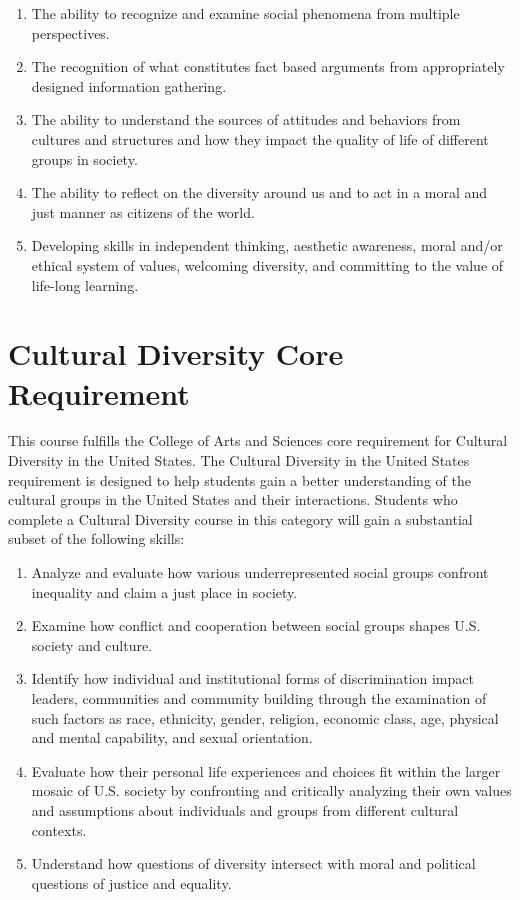 \documentclass[]{book}
\begin{document}
\begin{enumerate}
\def\labelenumi{\arabic{enumi}.}
\item
  The ability to recognize and examine social phenomena from multiple perspectives.
\item
  The recognition of what constitutes fact based arguments from appropriately designed information gathering.
\item
  The ability to understand the sources of attitudes and behaviors from cultures and structures and how they impact the quality of life of different groups in society.
\item
  The ability to reflect on the diversity around us and to act in a moral and just manner as citizens of the world.
\item
  Developing skills in independent thinking, aesthetic awareness, moral and/or ethical system of values, welcoming diversity, and committing to the value of life-long learning.
\end{enumerate}

\hypertarget{cultural-diversity-core-requirement}{%
\section{Cultural Diversity Core Requirement}\label{cultural-diversity-core-requirement}}

This course fulfills the College of Arts and Sciences core requirement for Cultural Diversity in the United States. The Cultural Diversity in the United States requirement is designed to help students gain a better understanding of the cultural groups in the United States and their interactions. Students who complete a Cultural Diversity course in this category will gain a substantial subset of the following skills:

\begin{enumerate}
\def\labelenumi{\arabic{enumi}.}
\item
  Analyze and evaluate how various underrepresented social groups confront inequality and claim a just place in society.
\item
  Examine how conflict and cooperation between social groups shapes U.S. society and culture.
\item
  Identify how individual and institutional forms of discrimination impact leaders, communities and community building through the examination of such factors as race, ethnicity, gender, religion, economic class, age, physical and mental capability, and sexual orientation.
\item
  Evaluate how their personal life experiences and choices fit within the larger mosaic of U.S. society by confronting and critically analyzing their own values and assumptions about individuals and groups from different cultural contexts.
\item
  Understand how questions of diversity intersect with moral and political questions of justice and equality.
\end{enumerate}
\end{document}
